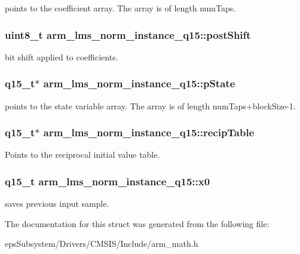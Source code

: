 points to the coefficient array. The array is of length num\-Taps. \hypertarget{structarm__lms__norm__instance__q15_aa0d435fbcf7dedb7179d4467e9b79e9f}{
\subsubsection[{post\-Shift}]{\setlength{\rightskip}{0pt plus 5cm}uint8\-\_\-t arm\-\_\-lms\-\_\-norm\-\_\-instance\-\_\-q15\-::post\-Shift}}\label{structarm__lms__norm__instance__q15_aa0d435fbcf7dedb7179d4467e9b79e9f}
bit shift applied to coefficients. \hypertarget{structarm__lms__norm__instance__q15_aa4de490b3bdbd03561b76ee07901c8e3}{
\subsubsection[{p\-State}]{\setlength{\rightskip}{0pt plus 5cm}q15\-\_\-t$\ast$ arm\-\_\-lms\-\_\-norm\-\_\-instance\-\_\-q15\-::p\-State}}\label{structarm__lms__norm__instance__q15_aa4de490b3bdbd03561b76ee07901c8e3}
points to the state variable array. The array is of length num\-Taps+block\-Size-\/1. \hypertarget{structarm__lms__norm__instance__q15_a9aabb0e4c79f3db807e7a441fa36f5f8}{
\subsubsection[{recip\-Table}]{\setlength{\rightskip}{0pt plus 5cm}q15\-\_\-t$\ast$ arm\-\_\-lms\-\_\-norm\-\_\-instance\-\_\-q15\-::recip\-Table}}\label{structarm__lms__norm__instance__q15_a9aabb0e4c79f3db807e7a441fa36f5f8}
Points to the reciprocal initial value table. \hypertarget{structarm__lms__norm__instance__q15_a3fc1d6f97d2c6d5324871de6895cb7e9}{
\subsubsection[{x0}]{\setlength{\rightskip}{0pt plus 5cm}q15\-\_\-t arm\-\_\-lms\-\_\-norm\-\_\-instance\-\_\-q15\-::x0}}\label{structarm__lms__norm__instance__q15_a3fc1d6f97d2c6d5324871de6895cb7e9}
saves previous input sample. 

The documentation for this struct was generated from the following file\-:\begin{DoxyCompactItemize}
\item 
eps\-Subsystem/\-Drivers/\-C\-M\-S\-I\-S/\-Include/arm\-\_\-math.\-h\end{DoxyCompactItemize}

